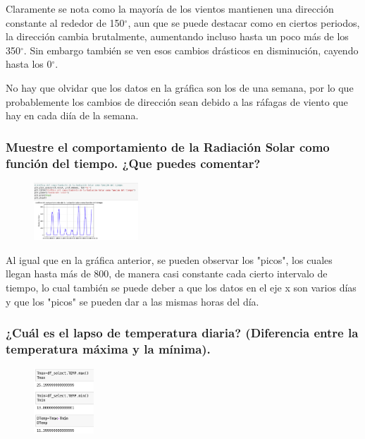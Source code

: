 \documentclass{article} %
\newcommand{\grad}{$^{\circ}$}
\begin{document}
Claramente se nota como la mayoría de los vientos mantienen una dirección constante al rededor de 150\grad, aun que se puede destacar como en ciertos periodos, la dirección cambia brutalmente, aumentando incluso hasta un poco más de los 350\grad. Sin embargo también se ven esos cambios drásticos en disminución, cayendo hasta los 0\grad. 

No hay que olvidar que los datos en la gráfica son los de una semana, por lo que probablemente los cambios de dirección sean debido a las ráfagas de viento que hay en cada diía de la semana.

\subsubsection {Muestre el comportamiento de la Radiación Solar como función del tiempo. ¿Que puedes comentar? }
\begin{figure}
  \centering
  \includegraphics[width=0.35\textwidth]{Radiacion.png}
  \label{fig:Actividades}
\end{figure}

Al igual que en la gráfica anterior, se pueden observar los "picos", los cuales llegan hasta más de 800, de manera casi constante cada cierto intervalo de tiempo, lo cual también se puede deber a que los datos en el eje x son varios días y que los "picos" se pueden dar a las mismas horas del día.
\subsubsection {¿Cuál es el lapso de temperatura diaria? (Diferencia entre la temperatura máxima y la mínima).}
\begin{figure}
  \centering
  \includegraphics[width=0.2\textwidth]{DifTemp.png}
  \label{fig:Actividades}
\end{figure}
\end{document}
